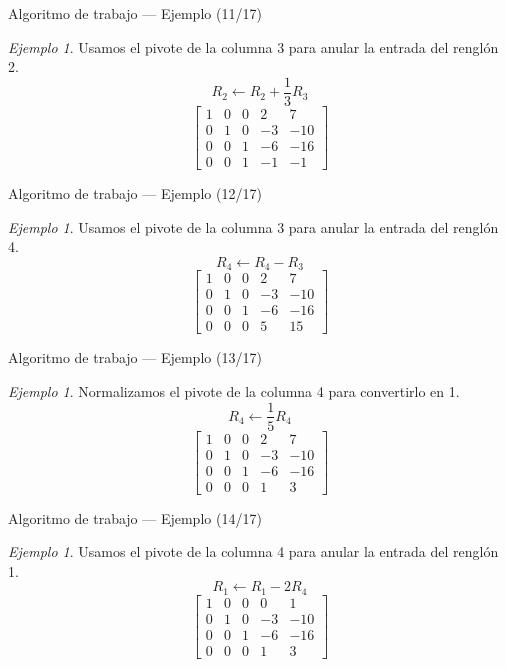 \documentclass[aspectratio=169,11pt]{beamer}
\theoremstyle{remark}
\newtheorem{Ejem}[definicion]{Ejemplo}
\begin{document}
\begin{frame}{Algoritmo de trabajo — Ejemplo (11/17)}
\begin{Ejem}
Usamos el pivote de la columna 3 para anular la entrada del renglón 2.
\[
R_{2}\leftarrow R_{2}+\frac{1}{3}R_{3}
\]
\[
\left[\begin{array}{cccc|c}
1 & 0 & 0 & 2 & 7\\
0 & 1 & 0 & -3 & -10\\
0 & 0 & 1 & -6 & -16\\
0 & 0 & 1 & -1 & -1
\end{array}\right]
\]
\end{Ejem}
\end{frame}

\begin{frame}{Algoritmo de trabajo — Ejemplo (12/17)}
\begin{Ejem}
Usamos el pivote de la columna 3 para anular la entrada del renglón 4.
\[
R_{4}\leftarrow R_{4}-R_{3}
\]
\[
\left[\begin{array}{cccc|c}
1 & 0 & 0 & 2 & 7\\
0 & 1 & 0 & -3 & -10\\
0 & 0 & 1 & -6 & -16\\
0 & 0 & 0 & 5 & 15
\end{array}\right]
\]
\end{Ejem}
\end{frame}

\begin{frame}{Algoritmo de trabajo — Ejemplo (13/17)}
\begin{Ejem}
Normalizamos el pivote de la columna 4 para convertirlo en 1.
\[
R_{4}\leftarrow \frac{1}{5}R_{4}
\]
\[
\left[\begin{array}{cccc|c}
1 & 0 & 0 & 2 & 7\\
0 & 1 & 0 & -3 & -10\\
0 & 0 & 1 & -6 & -16\\
0 & 0 & 0 & 1 & 3
\end{array}\right]
\]
\end{Ejem}
\end{frame}

\begin{frame}{Algoritmo de trabajo — Ejemplo (14/17)}
\begin{Ejem}
Usamos el pivote de la columna 4 para anular la entrada del renglón 1.
\[
R_{1}\leftarrow R_{1}-2R_{4}
\]
\[
\left[\begin{array}{cccc|c}
1 & 0 & 0 & 0 & 1\\
0 & 1 & 0 & -3 & -10\\
0 & 0 & 1 & -6 & -16\\
0 & 0 & 0 & 1 & 3
\end{array}\right]
\]
\end{Ejem}
\end{frame}
\end{document}
